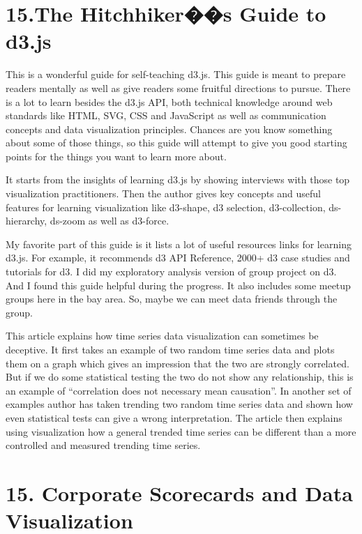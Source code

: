 \documentclass[]{book}
\theoremstyle{definition}
\theoremstyle{definition}
\theoremstyle{definition}
\theoremstyle{remark}
\begin{document}
\section{15.The Hitchhiker��s Guide to
d3.js}\label{the-hitchhikers-guide-to-d3.js}

This is a wonderful guide for self-teaching d3.js. This guide is meant
to prepare readers mentally as well as give readers some fruitful
directions to pursue. There is a lot to learn besides the d3.js API,
both technical knowledge around web standards like HTML, SVG, CSS and
JavaScript as well as communication concepts and data visualization
principles. Chances are you know something about some of those things,
so this guide will attempt to give you good starting points for the
things you want to learn more about.

It starts from the insights of learning d3.js by showing interviews with
those top visualization practitioners. Then the author gives key
concepts and useful features for learning visualization like d3-shape,
d3 selection, d3-collection, ds-hierarchy, ds-zoom as well as d3-force.

My favorite part of this guide is it lists a lot of useful resources
links for learning d3.js. For example, it recommends d3 API Reference,
2000+ d3 case studies and tutorials for d3. I did my exploratory
analysis version of group project on d3. And I found this guide helpful
during the progress. It also includes some meetup groups here in the bay
area. So, maybe we can meet data friends through the group.

This article explains how time series data visualization can sometimes
be deceptive. It first takes an example of two random time series data
and plots them on a graph which gives an impression that the two are
strongly correlated. But if we do some statistical testing the two do
not show any relationship, this is an example of ``correlation does not
necessary mean causation''. In another set of examples author has taken
trending two random time series data and shown how even statistical
tests can give a wrong interpretation. The article then explains using
visualization how a general trended time series can be different than a
more controlled and measured trending time series.

\section{15. Corporate Scorecards and Data
Visualization}\label{corporate-scorecards-and-data-visualization-1}
\end{document}
